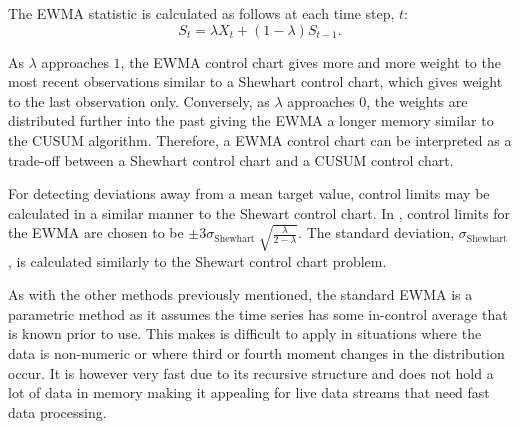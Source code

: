 The EWMA statistic is calculated as follows at each time step, $t$:
$$S_t = \lambda X_t + (1-\lambda)S_{t-1}. $$

As $\lambda$ approaches $1$, the EWMA control chart gives more and more weight to the most recent observations similar to a Shewhart control chart, which gives weight to the last observation only. Conversely, as $\lambda$ approaches $0$, the weights are distributed further into the past giving the EWMA a longer memory similar to the CUSUM algorithm. Therefore, a EWMA control chart can be interpreted as a trade-off between a Shewhart control chart and a CUSUM control chart. 

For detecting deviations away from a mean target value, control limits may be calculated in a similar manner to the Shewart control chart. In \cite{hunter1986exponentially}, control limits for the EWMA are chosen to be  $\pm 3 \sigma_{\text {Shewhart }} \sqrt{\frac{\lambda}{2-\lambda}}$. The standard deviation, $\sigma_{\text {Shewhart }}$, is calculated similarly to the Shewart control chart problem. %


As with the other methods previously mentioned, the standard EWMA is a parametric method as it assumes the time series has some in-control average that is known prior to use. This makes is difficult to apply in situations where the data is non-numeric or where third or fourth moment changes in the distribution occur. It is however very fast due to its recursive structure and does not hold a lot of data in memory making it appealing for live data streams that need fast data processing.